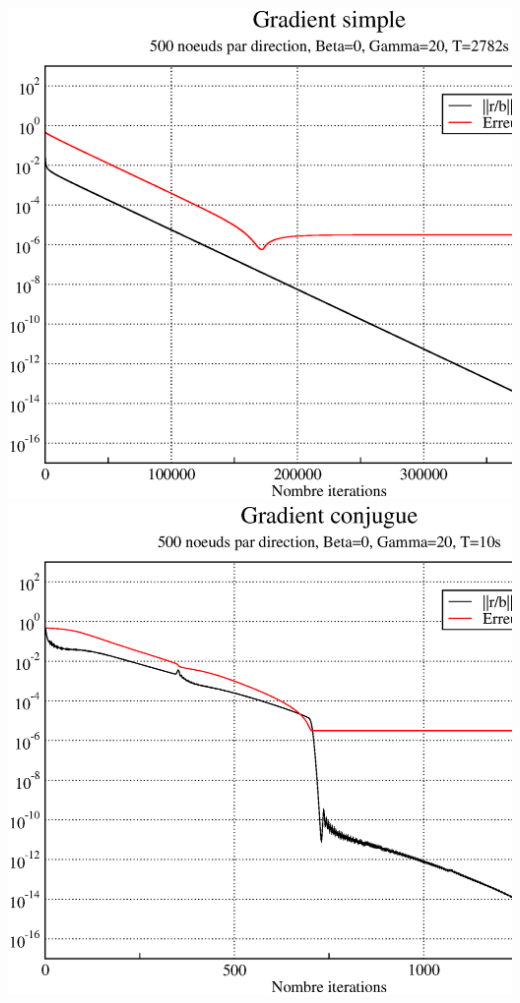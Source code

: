 \documentclass[twoside,12pt]{report}
\theoremstyle{remark}
\begin{document}
\begin{center}
\includegraphics[scale=0.36]{image/gs_500_0_20.eps}
\includegraphics[scale=0.36]{image/gc_500_0_20.eps}
\end{center}
\end{document}
